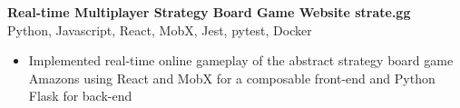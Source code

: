 \documentclass[letterpaper]{article}
\newcommand{\expheader}[4]{
    \vspace{2mm}
    \textbf{#1 \hfill #2}\\
    #3 \hfill #4\\
    \vspace{-2mm}
}
\begin{document}
\vspace{2mm}

\expheader{Real-time Multiplayer Strategy Board Game Website}{strate.gg}{Python, Javascript, React, MobX, Jest, pytest, Docker}{}
\begin{itemize} \itemsep 0pt
\item Implemented real-time online gameplay of the abstract strategy board game Amazons using React and MobX for a composable front-end and Python Flask for back-end\\
\end{itemize}
\end{document}
